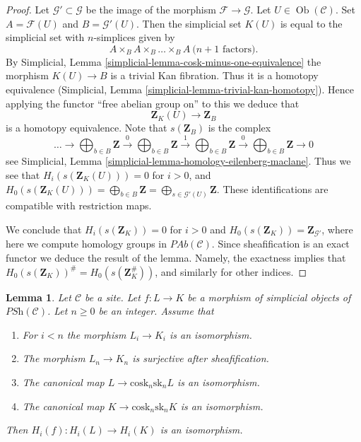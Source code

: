 \documentclass{stacks-project}
\theoremstyle{plain}
\newtheorem{lemma}[subsection]{Lemma}
\theoremstyle{definition}
\theoremstyle{remark}
\numberwithin{equation}{subsection}
\def\Ob{\mathop{\mathrm{Ob}}\nolimits}
\begin{document}
\begin{proof}
Let $\mathcal{G}' \subset \mathcal{G}$ be the image of
the morphism $\mathcal{F} \to \mathcal{G}$.
Let $U \in \Ob(\mathcal{C})$. Set
$A = \mathcal{F}(U)$ and $B = \mathcal{G}'(U)$.
Then the simplicial set $K(U)$ is equal to the simplicial
set with $n$-simplices given by
$$
A \times_B A \times_B \ldots \times_B A\ (n + 1 \text{ factors)}.
$$
By Simplicial, Lemma \ref{simplicial-lemma-cosk-minus-one-equivalence}
the morphism $K(U) \to B$ is a trivial Kan fibration.
Thus it is a homotopy equivalence
(Simplicial, Lemma \ref{simplicial-lemma-trivial-kan-homotopy}).
Hence applying the functor ``free abelian group on'' to this
we deduce that
$$
\mathbf{Z}_K(U) \longrightarrow \mathbf{Z}_B
$$
is a homotopy equivalence. Note that $s(\mathbf{Z}_B)$ is
the complex
$$
\ldots \to
\bigoplus\nolimits_{b \in B}\mathbf{Z} \xrightarrow{0}
\bigoplus\nolimits_{b \in B}\mathbf{Z} \xrightarrow{1}
\bigoplus\nolimits_{b \in B}\mathbf{Z} \xrightarrow{0}
\bigoplus\nolimits_{b \in B}\mathbf{Z} \to 0
$$
see Simplicial, Lemma \ref{simplicial-lemma-homology-eilenberg-maclane}.
Thus we see that
$H_i(s(\mathbf{Z}_K(U))) = 0$ for $i > 0$, and
$H_0(s(\mathbf{Z}_K(U))) = \bigoplus_{b \in B}\mathbf{Z}
= \bigoplus_{s \in \mathcal{G}'(U)} \mathbf{Z}$.
These identifications are compatible with restriction
maps.

\medskip\noindent
We conclude that $H_i(s(\mathbf{Z}_K)) = 0$ for $i > 0$ and
$H_0(s(\mathbf{Z}_K)) = \mathbf{Z}_{\mathcal{G}'}$, where here
we compute homology groups in $\textit{PAb}(\mathcal{C})$. Since
sheafification is an exact functor we deduce the result
of the lemma. Namely, the exactness implies
that $H_0(s(\mathbf{Z}_K))^\# = H_0(s(\mathbf{Z}_K^\#))$,
and similarly for other indices.
\end{proof}

\begin{lemma}
\label{lemma-acyclicity}
Let $\mathcal{C}$ be a site.
Let $f : L \to K$ be a morphism of
simplicial objects of $\textit{PSh}(\mathcal{C})$.
Let $n \geq 0$ be an integer.
Assume that
\begin{enumerate}
\item For $i < n$ the morphism $L_i \to K_i$ is an isomorphism.
\item The morphism $L_n \to K_n$ is surjective after sheafification.
\item The canonical map $L \to \text{cosk}_n \text{sk}_n L$ is an isomorphism.
\item The canonical map $K \to \text{cosk}_n \text{sk}_n K$ is an isomorphism.
\end{enumerate}
Then $H_i(f) : H_i(L) \to H_i(K)$ is an isomorphism.
\end{lemma}
\end{document}
